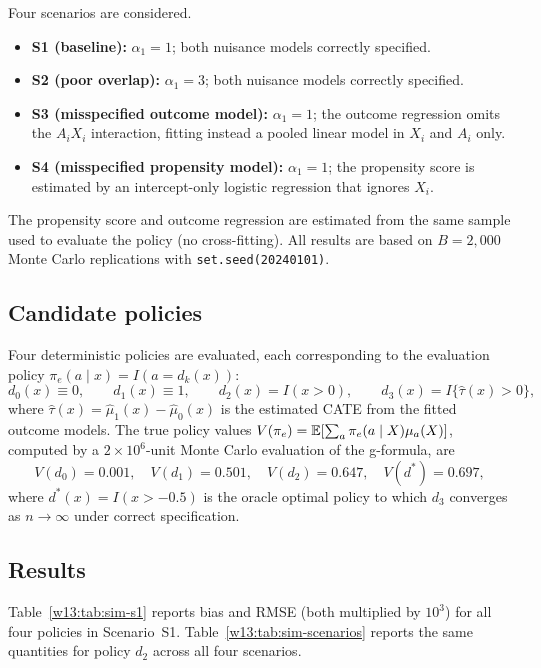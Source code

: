 \documentclass[master.tex]{subfiles}
\begin{document}
Four scenarios are considered.
\begin{itemize}
  \item \textbf{S1 (baseline):} $\alpha_1=1$; both nuisance models
    correctly specified.
  \item \textbf{S2 (poor overlap):} $\alpha_1=3$; both nuisance models
    correctly specified.
  \item \textbf{S3 (misspecified outcome model):} $\alpha_1=1$; the
    outcome regression omits the $A_i X_i$ interaction, fitting instead a
    pooled linear model in $X_i$ and $A_i$ only.
  \item \textbf{S4 (misspecified propensity model):} $\alpha_1=1$; the
    propensity score is estimated by an intercept-only logistic regression
    that ignores $X_i$.
\end{itemize}
The propensity score and outcome regression are estimated from the same
sample used to evaluate the policy (no cross-fitting).  All results are
based on $B=2{,}000$ Monte Carlo replications with
\texttt{set.seed(20240101)}.

\subsection{Candidate policies}
\label{w13:subsec:lab-policies}

Four deterministic policies are evaluated, each corresponding to the
evaluation policy $\pi_e(a\mid x)=I(a=d_k(x))$:
\[
d_0(x)\equiv 0,\qquad
d_1(x)\equiv 1,\qquad
d_2(x)=I(x>0),\qquad
d_3(x)=I\{\hat\tau(x)>0\},
\]
where $\hat\tau(x)=\hat\mu_1(x)-\hat\mu_0(x)$ is the estimated CATE
from the fitted outcome models.  The true policy values
$V(\pi_e)=\mathbb{E}[\sum_a\pi_e(a\mid X)\mu_a(X)]$, computed by a
$2\times 10^6$-unit Monte Carlo evaluation of the g-formula, are
\[
V(d_0)=0.001,\quad V(d_1)=0.501,\quad V(d_2)=0.647,\quad
V(d^*)=0.697,
\]
where $d^*(x)=I(x>-0.5)$ is the oracle optimal policy to which $d_3$
converges as $n\to\infty$ under correct specification.

\subsection{Results}
\label{w13:subsec:lab-results}

Table~\ref{w13:tab:sim-s1} reports bias and RMSE (both multiplied by
$10^3$) for all four policies in Scenario~S1.
Table~\ref{w13:tab:sim-scenarios} reports the same quantities for
policy $d_2$ across all four scenarios.
\end{document}
